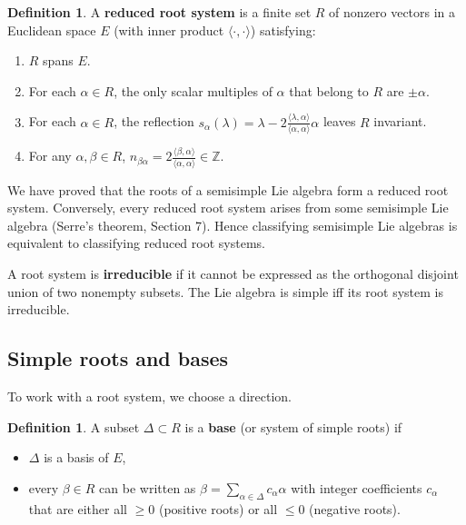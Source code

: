 \documentclass{article}
\theoremstyle{definition}
\newtheorem{definition}[theorem]{Definition}
\theoremstyle{remark}
\newcommand{\Z}{\mathbb{Z}}
\newcommand{\D}{\Delta}
\begin{document}
\begin{definition}
A \textbf{reduced root system} is a finite set $R$ of nonzero vectors in a Euclidean
space $E$ (with inner product $\langle\cdot,\cdot\rangle$) satisfying:
\begin{enumerate}[label=(R\arabic*)]
  \item $R$ spans $E$.
  \item For each $\alpha\in R$, the only scalar multiples of $\alpha$ that belong to $R$
    are $\pm\alpha$.
  \item For each $\alpha\in R$, the reflection $s_\alpha(\lambda) = \lambda - 2\frac{\langle\lambda,\alpha\rangle}{\langle\alpha,\alpha\rangle}\alpha$
    leaves $R$ invariant.
  \item For any $\alpha,\beta\in R$, $n_{\beta\alpha} = 2\frac{\langle\beta,\alpha\rangle}{\langle\alpha,\alpha\rangle} \in \Z$.
\end{enumerate}
\end{definition}
We have proved that the roots of a semisimple Lie algebra form a reduced root system.
Conversely, every reduced root system arises from some semisimple Lie algebra (Serre’s
theorem, Section 7). Hence classifying semisimple Lie algebras is equivalent to
classifying reduced root systems.

A root system is \textbf{irreducible} if it cannot be expressed as the orthogonal
disjoint union of two nonempty subsets. The Lie algebra is simple iff its root
system is irreducible.

\subsection{Simple roots and bases}
To work with a root system, we choose a direction.

\begin{definition}
A subset $\D \subset R$ is a \textbf{base} (or system of simple roots) if
\begin{itemize}
  \item $\D$ is a basis of $E$,
  \item every $\beta\in R$ can be written as $\beta = \sum_{\alpha\in\D} c_\alpha \alpha$
    with integer coefficients $c_\alpha$ that are either all $\ge 0$ (positive roots)
    or all $\le 0$ (negative roots).
\end{itemize}
\end{definition}
\end{document}
